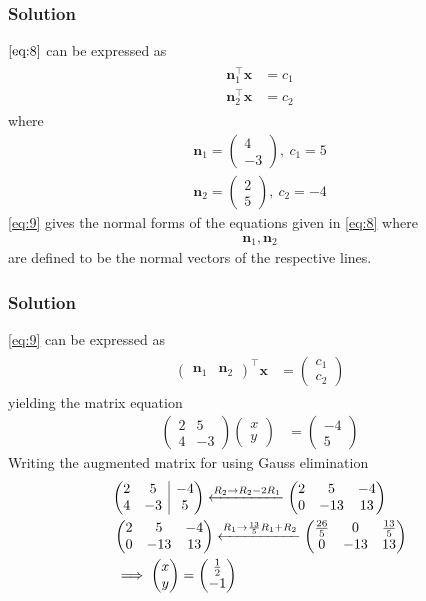 \documentclass{beamer}
\makeatletter
\theoremstyle{remark}
\newcommand{\myvec}[1]{\ensuremath{\begin{pmatrix}#1\end{pmatrix}}}
\newenvironment{amatrix}[1]{%
  \left(\begin{array}{@{}*{#1}{c}|c@{}}
}{%
  \end{array}\right)
}
\let\vec\mathbf
\makeatother
\begin{document}
\begin{frame}
\frametitle{Solution}
$\eqref{eq:8}$
    can be expressed as
\begin{align}
\label{eq:9}
\begin{split}
    \vec{n}_1^{\top}\vec{x} &= c_1
    \\
    \vec{n}_2^{\top}\vec{x} &= c_2
\end{split}
\end{align}
where
\begin{align}
	\vec{n}_1 = \myvec{4\\-3},\ c_1 = 5
	\\
	\vec{n}_2 = \myvec{2\\5},\ c_2 = -4
\end{align}
\eqref{eq:9} gives the normal forms of the equations given in 
\eqref{eq:8}  where 
\begin{align}
\vec{n}_1, \vec{n}_2 
\end{align}
are defined to be the normal vectors of the respective lines.
\end{frame}
\begin{frame}
\frametitle{Solution}
\eqref{eq:9}
can be expressed as
\begin{align}
\begin{split}
	\myvec{\vec{n}_1 & \vec{n}_2}^{\top}\vec{x} &= \myvec{ c_1 \\ c_2}
\end{split}
\end{align}
yielding the matrix equation
\begin{align}
    \myvec{
        2 & 5\\ 
        4 & -3
    }
    \myvec{
        x\\
        y
    } &= \myvec{
        -4\\
        5
    } 
    \end{align}
    Writing the augmented matrix for using Gauss elimination
    \begin{align}
        &\begin{amatrix}{2}
   2 & 5 & -4 \\  4 & -3 & 5
 \end{amatrix} \xleftarrow{R_2 \to R_2-2R_1}
  \myvec{
   2 & 5 & -4 \\  0 & -13 & 13
 } 
 \\
&\myvec{
   2 & 5 & -4 \\  0 & -13 & 13
 } \xleftarrow{R_1 \to \frac{13}{5}R_1+R_2}
 \myvec{
   \frac{26}{5} & 0 & \frac{13}{5} \\  0 & -13 & 13
 }  \label{14}
 \\
    & \implies \myvec{
        x\\
        y
    } =
    \myvec{
        \frac{1}{2}\\
        -1
    }
    \end{align}
\end{frame}
\end{document}
